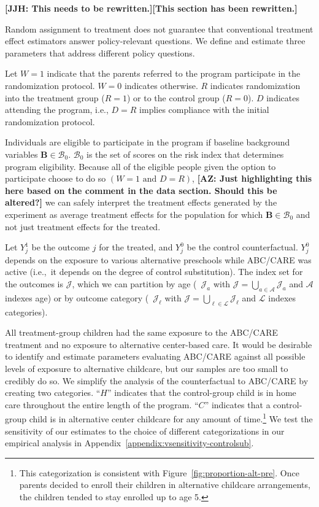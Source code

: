 \textbf{[JJH: This needs to be rewritten.][This section has been rewritten.]}

Random assignment to treatment does not guarantee that conventional treatment effect estimators answer policy-relevant questions. We define and estimate three parameters that address different policy questions.

Let $W=1$ indicate that the parents referred to the program participate in the randomization protocol. $W=0$ indicates otherwise. $R$ indicates randomization into the treatment group ($R = 1$) or to the control group ($R = 0$). $D$ indicates attending the program, i.e., $D = R$ implies compliance with the initial randomization protocol.

Individuals are eligible to participate in the program if baseline background variables $\bm{B}\in\mathcal{B}_0$. $\mathcal{B}_0$ is the set of scores on the risk index that determines program eligibility. Because all of the eligible people given the option to participate choose to do so $(W=1\text{ and } D=R)$, \textbf{[AZ: Just highlighting this here based on the comment in the data section. Should this be altered?]} we can safely interpret the treatment effects generated by the experiment as average treatment effects for the population for which $\bm{B}\in\mathcal{B}_0$ and not just treatment effects for the treated.

Let $Y^1_{j}$ be the outcome $j$ for the treated, and $Y^0_{j}$ be the control counterfactual. $Y^0_{j}$ depends on the exposure to various alternative preschools while ABC/CARE was active (i.e.,\ it depends on the degree of control substitution). The index set for the outcomes is $\mathcal{J}$, which we can partition by age (\ $\mathcal{J}_a$ with $\mathcal{J} = \bigcup \limits _{a \in \mathcal{A}} \mathcal{J}_a$ and $\mathcal{A}$ indexes age) or by outcome category (\ $\mathcal{J}_\ell$ with $\mathcal{J} = \bigcup \limits _{\ell \in \mathcal{L}} \mathcal{J}_\ell$ and $\mathcal{L}$ indexes categories). 

 All treatment-group children had the same exposure to the ABC/CARE treatment and no exposure to alternative center-based care. It would be desirable to identify and estimate parameters evaluating ABC/CARE against all possible levels of exposure to alternative childcare, but our samples are too small to credibly do so. We simplify the analysis of the counterfactual to ABC/CARE by creating two categories. ``$H$'' indicates that the control-group child is in home care throughout the entire length of the program. ``$C$'' indicates that a control-group child is in alternative center childcare for any amount of time.\footnote{This categorization is consistent with Figure~\ref{fig:proportion-alt-pre}. Once parents decided to enroll their children in alternative childcare arrangements, the children tended to stay enrolled up to age 5.} We test the sensitivity of our estimates to the choice of different categorizations in our empirical analysis in Appendix~\ref{appendix:vsensitivity-controlsub}.

